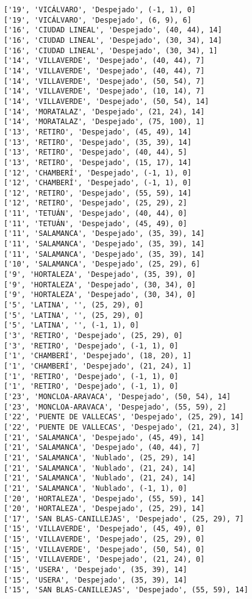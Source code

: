 \documentclass[11pt]{article}
\begin{document}
\begin{Verbatim}[commandchars=\\\{\}]
['19', 'VICÁLVARO', 'Despejado', (-1, 1), 0]
['19', 'VICÁLVARO', 'Despejado', (6, 9), 6]
['16', 'CIUDAD LINEAL', 'Despejado', (40, 44), 14]
['16', 'CIUDAD LINEAL', 'Despejado', (30, 34), 14]
['16', 'CIUDAD LINEAL', 'Despejado', (30, 34), 1]
['14', 'VILLAVERDE', 'Despejado', (40, 44), 7]
['14', 'VILLAVERDE', 'Despejado', (40, 44), 7]
['14', 'VILLAVERDE', 'Despejado', (50, 54), 7]
['14', 'VILLAVERDE', 'Despejado', (10, 14), 7]
['14', 'VILLAVERDE', 'Despejado', (50, 54), 14]
['14', 'MORATALAZ', 'Despejado', (21, 24), 14]
['14', 'MORATALAZ', 'Despejado', (75, 100), 1]
['13', 'RETIRO', 'Despejado', (45, 49), 14]
['13', 'RETIRO', 'Despejado', (35, 39), 14]
['13', 'RETIRO', 'Despejado', (40, 44), 5]
['13', 'RETIRO', 'Despejado', (15, 17), 14]
['12', 'CHAMBERÍ', 'Despejado', (-1, 1), 0]
['12', 'CHAMBERÍ', 'Despejado', (-1, 1), 0]
['12', 'RETIRO', 'Despejado', (55, 59), 14]
['12', 'RETIRO', 'Despejado', (25, 29), 2]
['11', 'TETUÁN', 'Despejado', (40, 44), 0]
['11', 'TETUÁN', 'Despejado', (45, 49), 0]
['11', 'SALAMANCA', 'Despejado', (35, 39), 14]
['11', 'SALAMANCA', 'Despejado', (35, 39), 14]
['11', 'SALAMANCA', 'Despejado', (35, 39), 14]
['10', 'SALAMANCA', 'Despejado', (25, 29), 6]
['9', 'HORTALEZA', 'Despejado', (35, 39), 0]
['9', 'HORTALEZA', 'Despejado', (30, 34), 0]
['9', 'HORTALEZA', 'Despejado', (30, 34), 0]
['5', 'LATINA', '', (25, 29), 0]
['5', 'LATINA', '', (25, 29), 0]
['5', 'LATINA', '', (-1, 1), 0]
['3', 'RETIRO', 'Despejado', (25, 29), 0]
['3', 'RETIRO', 'Despejado', (-1, 1), 0]
['1', 'CHAMBERÍ', 'Despejado', (18, 20), 1]
['1', 'CHAMBERÍ', 'Despejado', (21, 24), 1]
['1', 'RETIRO', 'Despejado', (-1, 1), 0]
['1', 'RETIRO', 'Despejado', (-1, 1), 0]
['23', 'MONCLOA-ARAVACA', 'Despejado', (50, 54), 14]
['23', 'MONCLOA-ARAVACA', 'Despejado', (55, 59), 2]
['22', 'PUENTE DE VALLECAS', 'Despejado', (25, 29), 14]
['22', 'PUENTE DE VALLECAS', 'Despejado', (21, 24), 3]
['21', 'SALAMANCA', 'Despejado', (45, 49), 14]
['21', 'SALAMANCA', 'Despejado', (40, 44), 7]
['21', 'SALAMANCA', 'Nublado', (25, 29), 14]
['21', 'SALAMANCA', 'Nublado', (21, 24), 14]
['21', 'SALAMANCA', 'Nublado', (21, 24), 14]
['21', 'SALAMANCA', 'Nublado', (-1, 1), 0]
['20', 'HORTALEZA', 'Despejado', (55, 59), 14]
['20', 'HORTALEZA', 'Despejado', (25, 29), 14]
['17', 'SAN BLAS-CANILLEJAS', 'Despejado', (25, 29), 7]
['15', 'VILLAVERDE', 'Despejado', (45, 49), 0]
['15', 'VILLAVERDE', 'Despejado', (25, 29), 0]
['15', 'VILLAVERDE', 'Despejado', (50, 54), 0]
['15', 'VILLAVERDE', 'Despejado', (21, 24), 0]
['15', 'USERA', 'Despejado', (35, 39), 14]
['15', 'USERA', 'Despejado', (35, 39), 14]
['15', 'SAN BLAS-CANILLEJAS', 'Despejado', (55, 59), 14]

\end{Verbatim}
\end{document}
